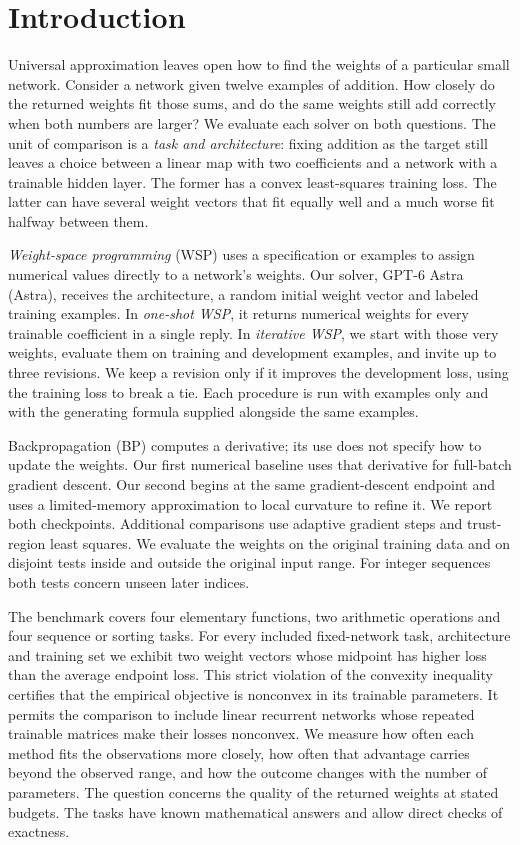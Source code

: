 \section{Introduction}
Universal approximation leaves open how to find the weights of a particular small network. Consider a network given twelve examples of addition. How closely do the returned weights fit those sums, and do the same weights still add correctly when both numbers are larger? We evaluate each solver on both questions. The unit of comparison is a \emph{task and architecture}: fixing addition as the target still leaves a choice between a linear map with two coefficients and a network with a trainable hidden layer. The former has a convex least-squares training loss. The latter can have several weight vectors that fit equally well and a much worse fit halfway between them.

\emph{Weight-space programming} (WSP) uses a specification or examples to assign numerical values directly to a network's weights. Our solver, GPT-6 Astra (Astra), receives the architecture, a random initial weight vector and labeled training examples. In \emph{one-shot WSP}, it returns numerical weights for every trainable coefficient in a single reply. In \emph{iterative WSP}, we start with those very weights, evaluate them on training and development examples, and invite up to three revisions. We keep a revision only if it improves the development loss, using the training loss to break a tie. Each procedure is run with examples only and with the generating formula supplied alongside the same examples.

Backpropagation (BP) computes a derivative; its use does not specify how to update the weights. Our first numerical baseline uses that derivative for full-batch gradient descent. Our second begins at the same gradient-descent endpoint and uses a limited-memory approximation to local curvature to refine it. We report both checkpoints. Additional comparisons use adaptive gradient steps and trust-region least squares. We evaluate the weights on the original training data and on disjoint tests inside and outside the original input range. For integer sequences both tests concern unseen later indices.

The benchmark covers four elementary functions, two arithmetic operations and four sequence or sorting tasks. For every included fixed-network task, architecture and training set we exhibit two weight vectors whose midpoint has higher loss than the average endpoint loss. This strict violation of the convexity inequality certifies that the empirical objective is nonconvex in its trainable parameters. It permits the comparison to include linear recurrent networks whose repeated trainable matrices make their losses nonconvex. We measure how often each method fits the observations more closely, how often that advantage carries beyond the observed range, and how the outcome changes with the number of parameters. The question concerns the quality of the returned weights at stated budgets. The tasks have known mathematical answers and allow direct checks of exactness.

